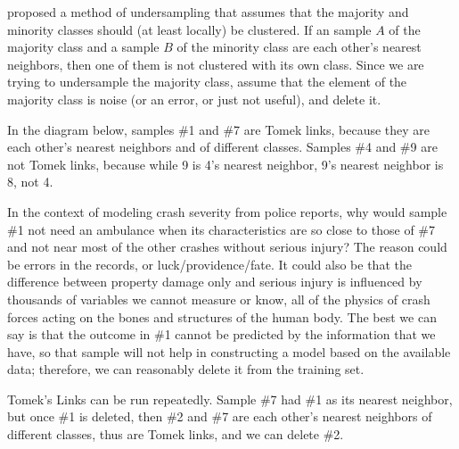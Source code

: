 \cite{ivan1976two} proposed a method of undersampling that assumes that the majority and minority classes should (at least locally) be clustered.  If an sample $A$ of the majority class and a sample $B$ of the minority class are each other's nearest neighbors, then one of them is not clustered with its own class.  Since we are trying to undersample the majority class, assume that the element of the majority class is noise (or an error, or just not useful), and delete it.  

In the diagram below, samples \#1 and \#7 are Tomek links, because they are each other's nearest neighbors and of different classes.  Samples \#4 and \#9 are not Tomek links, because while 9 is 4's nearest neighbor, 9's nearest neighbor is 8, not 4.  

In the context of modeling crash severity from police reports, why would sample \#1 not need an ambulance when its characteristics are so close to those of \#7 and not near most of the other crashes without serious injury?  The reason could be errors in the records, or luck/providence/fate.  It could also be that the difference between property damage only and serious injury is influenced by thousands of variables we cannot measure or know, all of the physics of crash forces acting on the bones and structures of the human body.  The best we can say is that the outcome in \#1 cannot be predicted by the information that we have, so that sample will not help in constructing a model based on the available data; therefore, we can reasonably delete it from the training set.  

Tomek's Links can be run repeatedly.  Sample \#7 had \#1 as its nearest neighbor, but once \#1 is deleted, then \#2 and \#7 are each other's nearest neighbors of different classes, thus are Tomek links, and we can delete \#2.  



\begin{center}
\end{center}



